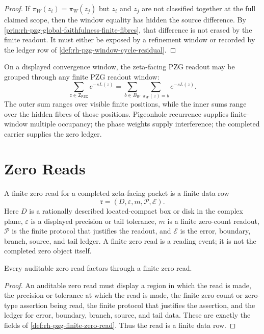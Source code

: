 \begin{proof}
If $\pi_W(z_i)=\pi_W(z_j)$ but $z_i$ and $z_j$ are not classified together at
the full claimed scope, then the window equality has hidden the source
difference.  By
\autoref{prin:rh-pzg-global-faithfulness-finite-fibres}, that difference is
not erased by the finite readout.  It must either be exposed by a refinement
window or recorded by the ledger row of
\autoref{def:rh-pzg-window-cycle-residual}.
\end{proof}

\begin{principle}
\label{prin:rh-pzg-zeta-groups-finite-window-fibres}
On a displayed convergence window, the zeta-facing PZG readout may be grouped
through any finite PZG readout window:
$$
\sum_{z\in\mathsf Z_{\mathsf{PZG}}}e^{-sL(z)}
=
\sum_{b\in B_W}
\sum_{\pi_W(z)=b}e^{-sL(z)}.
$$
The outer sum ranges over visible finite positions, while the inner sums range
over the hidden fibres of those positions.  Pigeonhole recurrence supplies
finite-window multiple occupancy; the phase weights supply interference; the
completed carrier supplies the zero ledger.
\end{principle}

\section{Zero Reads}
\label{sec:rh-pzg-finite-window-zero-reads}

\begin{definition}
\label{def:rh-pzg-finite-zero-read}
A finite zero read for a completed zeta-facing packet is a finite data row
$$
\mathfrak r=(D,\varepsilon,m,\mathcal P,\mathcal E).
$$
Here $D$ is a rationally described located-compact box or disk in the complex
plane, $\varepsilon$ is a displayed precision or tail tolerance, $m$ is a
finite zero-count readout, $\mathcal P$ is the finite protocol that justifies
the readout, and $\mathcal E$ is the error, boundary, branch, source, and tail
ledger.  A finite zero read is a reading event; it is not the completed zero
object itself.
\end{definition}

\begin{theorem}
\label{thm:rh-pzg-zeroread-finite-read}
Every auditable zero read factors through a finite zero read.
\end{theorem}

\begin{proof}
An auditable zero read must display a region in which the read is made, the
precision or tolerance at which the read is made, the finite zero count or
zero-type assertion being read, the finite protocol that justifies the
assertion, and the ledger for error, boundary, branch, source, and tail data.
These are exactly the fields of
\autoref{def:rh-pzg-finite-zero-read}.  Thus the read is a finite data row.
\end{proof}

